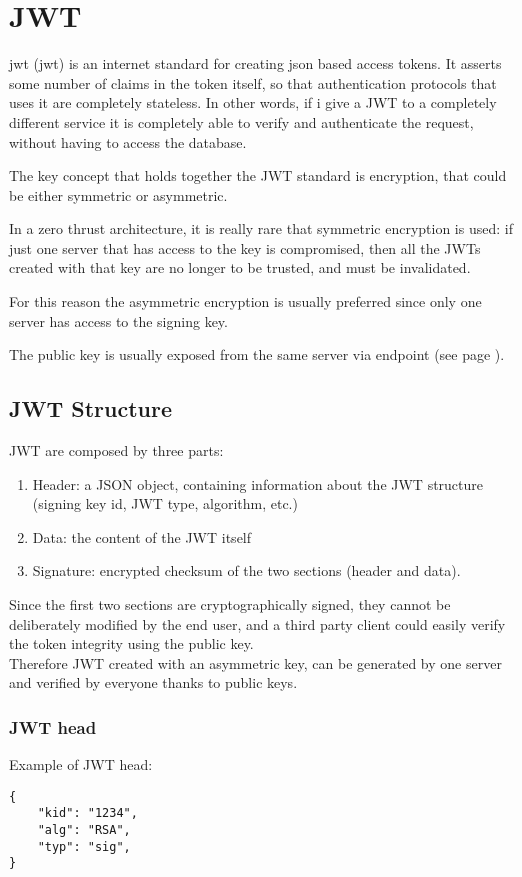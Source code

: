 \section{JWT}
\label{jwt}
\acs{jwt} (\acl{jwt}) is an internet standard for creating \acs{json} based access tokens.
It asserts some number of claims in the token itself, so that authentication
protocols that uses it are completely stateless.
In other words, if i give a JWT to a completely different service it is
completely able to verify and authenticate the request, without having to access
the database.

The key concept that holds together the JWT standard is encryption, that could
be either symmetric or asymmetric.

In a zero thrust architecture, it is really rare that symmetric encryption is
used: if just one server that has access to the key is compromised, then all the
JWTs created with that key are no longer to be trusted, and must be invalidated.

For this reason the asymmetric encryption is usually preferred since only one
server has access to the signing key.

The public key is usually exposed from the same server via endpoint (see page
\pageref{jwks}).

\subsection{JWT Structure}
JWT are composed by three  parts:

\begin{enumerate}
    \item Header: a JSON object, containing information about the JWT structure
        (signing key id, JWT type, algorithm, etc.)
    \item Data: the content of the JWT itself
    \item Signature: encrypted checksum of the two sections (header and data).
\end{enumerate}

Since the first two sections are cryptographically signed, they cannot be
deliberately modified by the end user, and a third party client could easily
verify the token integrity using the public key.
\\
Therefore JWT created with an asymmetric key, can be generated by one server and
verified by everyone thanks to public keys.

\subsubsection{JWT head}
Example of JWT head:
\begin{lstlisting}
{
    "kid": "1234",
    "alg": "RSA",
    "typ": "sig",
}
\end{lstlisting}

